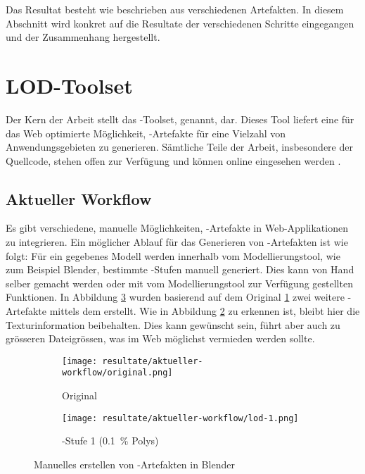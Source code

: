Das Resultat besteht wie beschrieben aus verschiedenen Artefakten. In diesem Abschnitt wird konkret auf die Resultate der verschiedenen Schritte eingegangen und der Zusammenhang hergestellt.

\section{LOD-Toolset}

Der Kern der Arbeit stellt das -Toolset,  genannt, dar. Dieses Tool liefert eine für das Web optimierte Möglichkeit, -Artefakte für eine Vielzahl von Anwendungsgebieten zu generieren. Sämtliche Teile der Arbeit, insbesondere der Quellcode, stehen offen zur Verfügung und können online eingesehen werden \cite{lode}.

\subsection{Aktueller Workflow}

Es gibt verschiedene, manuelle Möglichkeiten, -Artefakte in Web-Applikationen zu integrieren. Ein möglicher Ablauf für das Generieren von -Artefakten ist wie folgt:
Für ein gegebenes Modell werden innerhalb vom Modellierungstool, wie zum Beispiel Blender, bestimmte -Stufen manuell generiert. Dies kann von Hand selber gemacht werden oder mit vom Modellierungstool zur Verfügung gestellten Funktionen. In Abbildung \ref{fig:manualLodGenerationInBlender} wurden basierend auf dem Original \ref{fig:manualLodGenerationInBlenderOriginal} zwei weitere -Artefakte mittels dem  erstellt. Wie in Abbildung \ref{fig:manualLodGenerationInBlenderSimplified} zu erkennen ist, bleibt hier die Texturinformation beibehalten. Dies kann gewünscht sein, führt aber auch zu grösseren Dateigrössen, was im Web möglichst vermieden werden sollte.

\begin{figure}[H]
  \centering
  \begin{subfigure}{.45\textwidth}
    \centering
    \texttt{[image: resultate/aktueller-workflow/original.png]}
    \caption{Original}
    \label{fig:manualLodGenerationInBlenderOriginal}
  \end{subfigure}
  \begin{subfigure}{.45\textwidth}
    \centering
    \texttt{[image: resultate/aktueller-workflow/lod-1.png]}
    \caption{-Stufe 1 (0.1 \% Polys)}
    \label{fig:manualLodGenerationInBlenderSimplified}
  \end{subfigure}
  \caption{Manuelles erstellen von -Artefakten in Blender}
  \label{fig:manualLodGenerationInBlender}
\end{figure}

